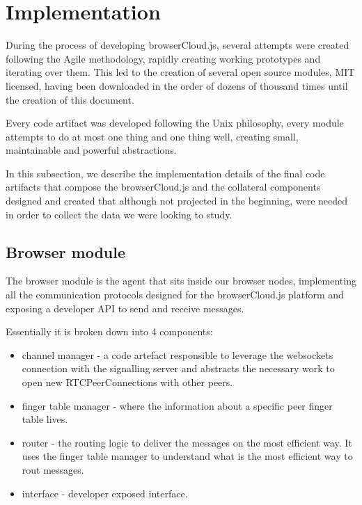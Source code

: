 
%
%

\section{Implementation}

During the process of developing browserCloud.js, several attempts were created following the Agile methodology, rapidly creating working prototypes and iterating over them. This led to the creation of several open source modules, MIT licensed, having been downloaded in the order of dozens of thousand times until the creation of this document.

Every code artifact was developed following the Unix philosophy, every module attempts to do at most one thing and one thing well, creating small, maintainable and powerful abstractions.

In this subsection, we describe the implementation details of the final code artifacts that compose the browserCloud.js and the collateral components designed and created that although not projected in the beginning, were needed in order to collect the data we were looking to study.

\subsection{Browser module}

The browser module is the agent that sits inside our browser nodes, implementing all the communication protocols designed for the browserCloud.js platform and exposing a developer API to send and receive messages.

Essentially it is broken down into 4 components:

\begin{itemize}
    \item channel manager - a code artefact responsible to leverage the websockets connection with the signalling server and abstracts the necessary work to open new RTCPeerConnections with other peers.
    \item finger table manager - where the information about a specific peer finger table lives.
    \item router - the routing logic to deliver the messages on the most efficient way. It uses the finger table manager to understand what is the most efficient way to rout messages.
    \item interface - developer exposed interface.
\end{itemize}

